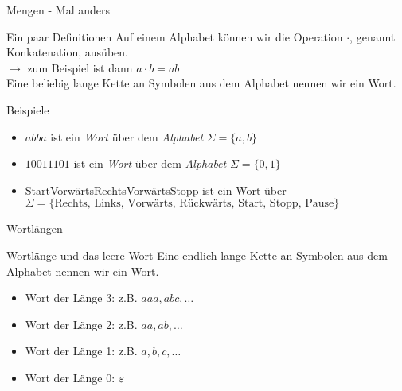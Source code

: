 \begin{frame}[fragile]{Mengen - Mal anders}
    \begin{alertblock}{Ein paar Definitionen}
    Auf einem Alphabet können wir die Operation $\cdot$\;, genannt \alert{Konkatenation}, ausüben.\\
    $\rightarrow$ zum Beispiel ist dann $a \cdot b = ab$\\
    Eine beliebig lange Kette an Symbolen aus dem Alphabet nennen wir ein \alert{Wort}.
    \end{alertblock}
    \begin{exampleblock}{Beispiele}
    \begin{itemize}
        \item $abba$ ist ein \emph{Wort} über dem \emph{Alphabet} $\Sigma = \{a,b\}$
        \item $10011101$ ist ein \emph{Wort} über dem \emph{Alphabet} $\Sigma = \{0,1\}$
        \item StartVorwärtsRechtsVorwärtsStopp ist ein Wort über $\Sigma = \{\text{Rechts, Links, Vorwärts, Rückwärts, Start, Stopp, Pause}\}$
    \end{itemize}
    
    \end{exampleblock}
\end{frame}

\begin{frame}{Wortlängen}
    \begin{alertblock}{Wortlänge und das leere Wort}
        Eine endlich lange Kette an Symbolen aus dem Alphabet nennen wir ein Wort.
    \end{alertblock}
    \begin{itemize}
        \item Wort der Länge 3: z.B. $aaa, abc, \dots$
        \item Wort der Länge 2: z.B. $aa, ab, \dots$
        \item Wort der Länge 1: z.B. $a, b, c, \dots$
        \item Wort der Länge \alert<2>{0}: \alert<2>{$\varepsilon$}
    \end{itemize}
\end{frame}

